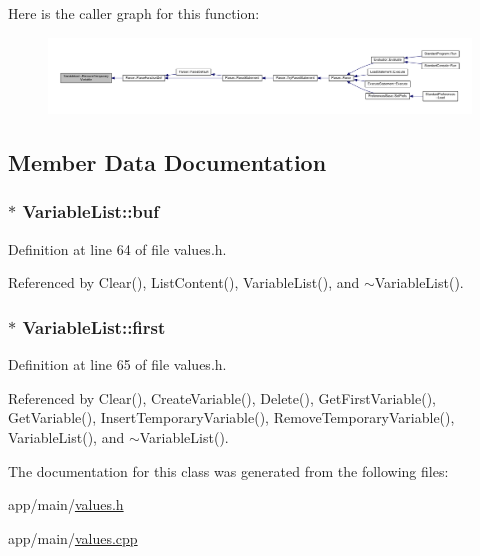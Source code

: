 Here is the caller graph for this function\+:
\nopagebreak
\begin{figure}[H]
\begin{center}
\leavevmode
\includegraphics[width=350pt]{d3/d0e/classVariableList_a489608dbcd6989a9ffd4092234a8052c_icgraph}
\end{center}
\end{figure}




\subsection{Member Data Documentation}
\subsubsection[{\texorpdfstring{buf}{buf}}]{$\ast$ Variable\+List\+::buf\hspace{0.3cm}{\ttfamily [private]}}\hypertarget{classVariableList_a11bf03542fab82869135f3f300890376}{}\label{classVariableList_a11bf03542fab82869135f3f300890376}


Definition at line 64 of file values.\+h.



Referenced by Clear(), List\+Content(), Variable\+List(), and $\sim$\+Variable\+List().

\subsubsection[{\texorpdfstring{first}{first}}]{$\ast$ Variable\+List\+::first\hspace{0.3cm}{\ttfamily [private]}}\hypertarget{classVariableList_a353a26f311a6d98716485f50c6907f7e}{}\label{classVariableList_a353a26f311a6d98716485f50c6907f7e}


Definition at line 65 of file values.\+h.



Referenced by Clear(), Create\+Variable(), Delete(), Get\+First\+Variable(), Get\+Variable(), Insert\+Temporary\+Variable(), Remove\+Temporary\+Variable(), Variable\+List(), and $\sim$\+Variable\+List().



The documentation for this class was generated from the following files\+:\begin{DoxyCompactItemize}
\item 
app/main/\hyperlink{values_8h}{values.\+h}\item 
app/main/\hyperlink{values_8cpp}{values.\+cpp}\end{DoxyCompactItemize}

